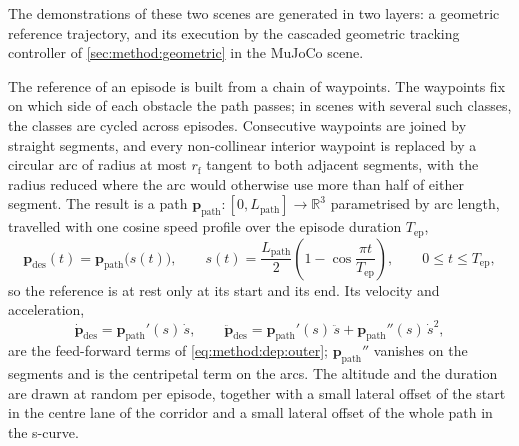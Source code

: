 \documentclass[headsepline,footsepline,footinclude=false,oneside,fontsize=11pt,paper=a4,listof=totoc,bibliography=totoc]{scrbook}
\theoremstyle{definition}
\theoremstyle{plain}
\theoremstyle{remark}
\newcommand{\vect}[1]{\boldsymbol{#1}}
\newcommand{\sidx}[1]{_{\textrm{#1}}}
\newcommand{\R}{\mathbb{R}}                    %
\begin{document}
The demonstrations of these two scenes are generated in two layers: a geometric reference trajectory,
and its execution by the cascaded geometric tracking controller of \autoref{sec:method:geometric} in the
MuJoCo scene.

The reference of an episode is built from a chain of waypoints. The waypoints fix on which side of each
obstacle the path passes; in scenes with several such classes, the classes are cycled across episodes.
Consecutive waypoints are joined by straight segments, and every non-collinear interior waypoint is
replaced by a circular arc of radius at most $r\sidx{f}$ tangent to both adjacent segments, with the
radius reduced where the arc would otherwise use more than half of either segment. The result is a
path $\vect{p}\sidx{path}:[0,L\sidx{path}]\to\R^{3}$ parametrised by arc length, travelled with one cosine
speed profile over the episode duration $T\sidx{ep}$,
\begin{equation}\label{eq:method:env:uavref}
  \vect{p}\sidx{des}(t) = \vect{p}\sidx{path}\big(s(t)\big),
  \qquad
  s(t) = \frac{L\sidx{path}}{2}\left(1-\cos\frac{\pi t}{T\sidx{ep}}\right),
  \qquad 0\le t\le T\sidx{ep},
\end{equation}
so the reference is at rest only at its start and its end. Its velocity and acceleration,
\begin{equation}\label{eq:method:env:uavrefderiv}
  \dot{\vect{p}}\sidx{des} = \vect{p}\sidx{path}'(s)\,\dot{s},
  \qquad
  \ddot{\vect{p}}\sidx{des} = \vect{p}\sidx{path}'(s)\,\ddot{s} + \vect{p}\sidx{path}''(s)\,\dot{s}^{2},
\end{equation}
are the feed-forward terms of \eqref{eq:method:dep:outer}; $\vect{p}\sidx{path}''$ vanishes on the segments
and is the centripetal term on the arcs. The altitude and the duration are drawn at random per
episode, together with a small lateral offset of the start in the centre lane of the corridor and a
small lateral offset of the whole path in the s-curve.
\end{document}
